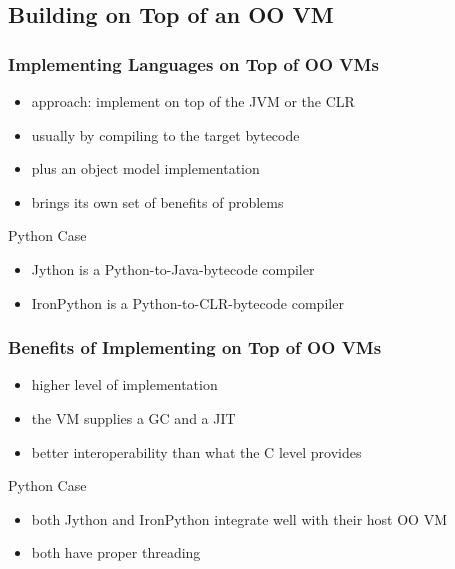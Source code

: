 \documentclass[utf8x]{beamer}
\begin{document}
\subsection{Building on Top of an OO VM}

\begin{frame}
  \frametitle{Implementing Languages on Top of OO VMs}
  \begin{itemize}
  \item approach: implement on top of the JVM or the CLR
  \item usually by compiling to the target bytecode
  \item plus an object model implementation
  \item brings its own set of benefits of problems
  \end{itemize}
  \pause
  \begin{block}{
    Python Case}
    \begin{itemize}
    \item \alert{Jython} is a Python-to-Java-bytecode compiler
    \item \alert{IronPython} is a Python-to-CLR-bytecode compiler
    \end{itemize}
  \end{block}
\end{frame}

\begin{frame}
  \frametitle{Benefits of Implementing on Top of OO VMs}
  \begin{itemize}
  \item higher level of implementation
  \item the VM supplies a GC and a JIT
  \item better interoperability than what the C level provides
  \end{itemize}
  \pause
  \begin{block}{
    Python Case}
    \begin{itemize}
    \item both Jython and IronPython integrate well with their host OO VM
    \item both have proper threading
    \end{itemize}
  \end{block}
\end{frame}
\end{document}
